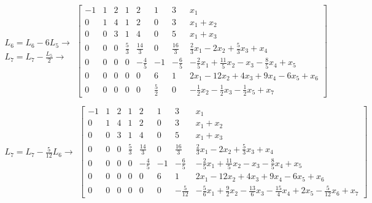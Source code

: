 \documentclass[11pt]{article}
\newenvironment{question}[1]
  {\par\addvspace{\medskipamount}
   \noindent\makebox[0pt][r]{\textbf{#1)} }\ignorespaces}
  {\par\addvspace{\medskipamount}}
\begin{document}
\begin{question}{4}
$$
\substack{
  \mbox{$L_6=L_6-6L_5 \rightarrow$}\\[.5em]
  \mbox{$L_7=L_7-\frac{L_5}{2} \rightarrow$}
}
\left[\begin{array}{rrrrrrr|l}
    -1 & 1 & 2 & 1 & 2 & 1 & 3 & x_1\\
    0 & 1 & 4 & 1 & 2 & 0 & 3 & x_1 + x_2\\
    0 & 0 & 3 & 1 & 4 & 0 & 5 & x_1 + x_3\\
    0 & 0 & 0 & \frac{5}{3} & \frac{14}{3} & 0 & \frac{16}{3} & \frac{2}{3}x_1 - 2 x_2 + \frac{5}{3}x_3 + x_4\\
    0 & 0 & 0 & 0 & - \frac{4}{5} & -1 & - \frac{6}{5} & - \frac{2}{5}x_1 + \frac{11}{5}x_2 - x_3 - \frac{8}{5}x_4 + x_5\\
    0 & 0 & 0 & 0 & 0 & 6 & 1 & 2 x_1 - 12 x_2 + 4 x_3 + 9 x_4 - 6 x_5 + x_6\\
    0 & 0 & 0 & 0 & 0 & \frac{5}{2} & 0 & - \frac{1}{2}x_2 - \frac{1}{2}x_3 - \frac{1}{2}x_5 + x_7
\end{array}\right]
$$

$$
\substack{
  \mbox{$L_7=L_7-\frac{5}{12}L_6 \rightarrow$}
}
\left[\begin{array}{rrrrrrr|l}
    -1 & 1 & 2 & 1 & 2 & 1 & 3 & x_1\\
    0 & 1 & 4 & 1 & 2 & 0 & 3 & x_1 + x_2\\
    0 & 0 & 3 & 1 & 4 & 0 & 5 & x_1 + x_3\\
    0 & 0 & 0 & \frac{5}{3} & \frac{14}{3} & 0 & \frac{16}{3} & \frac{2}{3}x_1 - 2 x_2 + \frac{5}{3}x_3 + x_4\\
    0 & 0 & 0 & 0 & - \frac{4}{5} & -1 & - \frac{6}{5} & - \frac{2}{5}x_1 + \frac{11}{5}x_2 - x_3 - \frac{8}{5}x_4 + x_5\\
    0 & 0 & 0 & 0 & 0 & 6 & 1 & 2 x_1 - 12 x_2 + 4 x_3 + 9 x_4 - 6 x_5 + x_6\\
    0 & 0 & 0 & 0 & 0 & 0 & - \frac{5}{12} & - \frac{5}{6}x_1 + \frac{9}{2}x_2 - \frac{13}{6}x_3 - \frac{15}{4}x_4 + 2 x_5 - \frac{5}{12}x_6 + x_7
\end{array}\right]
$$

\end{question}
\end{document}
